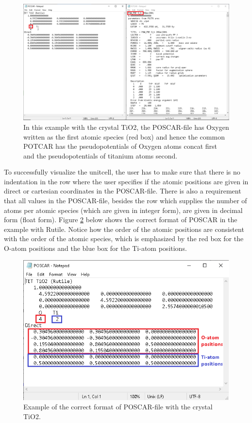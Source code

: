\begin{figure}[H]
    \centering
    \includegraphics[scale = 0.48]{images/usermanual_unit_TET.png}
    \caption{In this example with the crystal TiO2, the POSCAR-file has Oxygen written as the first atomic species (red box) and hence the common POTCAR has the pseudopotentials of Oxygen atoms concat first and the pseudopotentials of titanium atoms second.}
    \label{fig:VASP_unit}
\end{figure}

To successfully visualize the unitcell, the user has to make sure that there is no indentation in the row where the user specifies if the atomic positions are given in direct or cartesian coordinates in the POSCAR-file. There is also a requirement that all values in the POSCAR-file, besides the row which supplies the number of atoms per atomic species (which are given in integer form), are given in decimal form (float form). Figure \ref{fig:VASP_unit_1} below shows the correct format of POSCAR in the example with Rutile. Notice how the order of the atomic positions are consistent with the order of the atomic species, which is emphasized by the red box for the O-atom positions and the blue box for the Ti-atom positions.

\begin{figure}[H]
    \centering
    \includegraphics[scale = 0.50]{images/usermanual_unit_TET_2.png}
    \caption{Example of the correct format of POSCAR-file with the crystal TiO2.}
    \label{fig:VASP_unit_1}
\end{figure}

